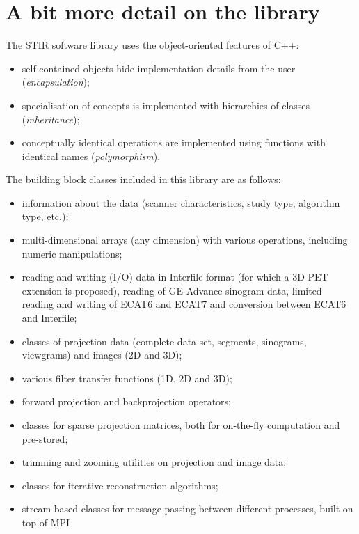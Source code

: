\documentclass{article}
\begin{document}
\section{
A bit more detail on the library}

The STIR software library uses the object-oriented features of 
C++:

\begin{itemize}

\item self-contained objects hide implementation details from the user 
(\textit{encapsulation});
\item specialisation of concepts is implemented with hierarchies 
of classes (\textit{inheritance});
\item conceptually identical operations are implemented using 
functions with identical names (\textit{polymorphism}).
\end{itemize}

The building block classes included in this library are as follows:

\begin{itemize}
\item information about the data (scanner characteristics, study type, 
algorithm type, etc.);
\item multi-dimensional arrays (any dimension) with various 
operations, including numeric manipulations;
\item reading and writing (I/O) data in Interfile format (for 
which a 3D PET extension is proposed), reading of GE Advance 
sinogram data, limited reading and writing of ECAT6 and ECAT7 
and conversion between ECAT6 and Interfile;
\item classes of projection data (complete data set, segments, 
sinograms, viewgrams) and images (2D and 3D);
\item various filter transfer functions (1D, 2D and 3D);
\item forward projection and backprojection operators;
\item classes for sparse projection matrices, both for on-the-fly 
computation and pre-stored;
\item trimming and zooming utilities on projection and image 
data;
\item classes for iterative reconstruction algorithms;
\item stream-based classes for message passing between different 
processes, built on top of MPI
\end{itemize}
\end{document}
